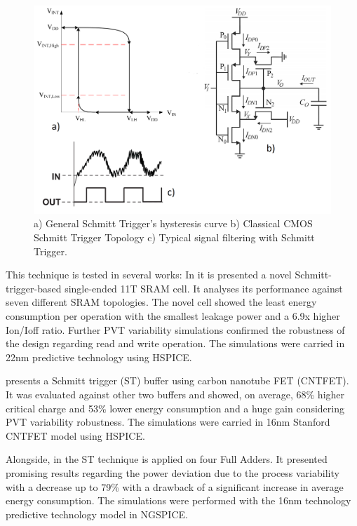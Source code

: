 \documentclass[ecp,tc, english]{iiufrgs}
\begin{document}
\begin{figure}[ht]
\centering
\includegraphics[width=1\textwidth]{Hysteresis.png}
\caption{a) General Schmitt Trigger's hysteresis curve b) Classical CMOS Schmitt Trigger Topology c) Typical signal filtering with Schmitt Trigger.}
\label{fig:Fig3}
\end{figure}

This technique is tested in several works: In \cite{ahmad2016single} it is presented a novel Schmitt-trigger-based single-ended 11T SRAM cell. It analyses its performance against seven different SRAM topologies. The novel cell showed the least energy consumption per operation with the smallest leakage power and a 6.9x higher Ion/Ioff ratio. Further PVT variability simulations confirmed the robustness of the design regarding read and write operation. The simulations were carried in 22nm predictive technology using HSPICE.

\cite{moghaddam2017design} presents a Schmitt trigger (ST) buffer using carbon nanotube FET (CNTFET). It was evaluated against other two buffers and showed, on average, 68\% higher critical charge and 53\% lower energy consumption and a huge gain considering PVT variability robustness. The simulations were carried in 16nm Stanford CNTFET model using HSPICE.
	
Alongside, in \cite{samuel2016} the ST technique is applied on four Full Adders. It presented promising results regarding the power deviation due to the process variability with a decrease up to 79\% with a drawback of a significant increase in average energy consumption. The simulations were performed with the 16nm technology predictive technology model in NGSPICE. 
\end{document}
